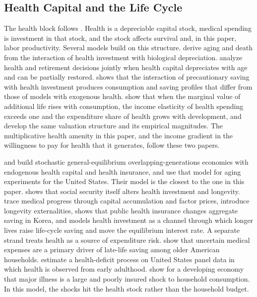 \subsection{Health Capital and the Life Cycle}
\label{subsec:lit_longevity}

The health block follows \citet{Grossman1972}. Health is a depreciable capital stock, medical spending is investment in that stock, and the stock affects survival and, in this paper, labor productivity. Several models build on this structure. \citet{DalgaardStrulik2014} derive aging and death from the interaction of health investment with biological depreciation. \citet{KuhnFeichtinger2015} analyze health and retirement decisions jointly when health capital depreciates with age and can be partially restored. \citet{Fioroni2010} shows that the interaction of precautionary saving with health investment produces consumption and saving profiles that differ from those of models with exogenous health. \citet{HallJones2007} show that when the marginal value of additional life rises with consumption, the income elasticity of health spending exceeds one and the expenditure share of health grows with development, and \citet{MurphyTopel2006} develop the same valuation structure and its empirical magnitudes. The multiplicative health amenity in this paper, and the income gradient in the willingness to pay for health that it generates, follow these two papers.

\citet{JungTran2016} and \citet{JungTranChambers2017} build stochastic general-equilibrium overlapping-generations economies with endogenous health capital and health insurance, and \citet{JungTranChambers2017} use that model for aging experiments for the United States. Their model is the closest to the one in this paper. \citet{Zhao2014} shows that social security itself alters health investment and longevity. \citet{FrankovicWrzaczek2020} trace medical progress through capital accumulation and factor prices, \citet{YewZhang2018} introduce longevity externalities, \citet{Lim2020} shows that public health insurance changes aggregate saving in Korea, and \citet{Carrasco2026} models health investment as a channel through which longer lives raise life-cycle saving and move the equilibrium interest rate. A separate strand treats health as a source of expenditure risk. \citet{DeNardi2010} show that uncertain medical expenses are a primary driver of late-life saving among older American households. \citet{HosseiniKopeckyZhao} estimate a health-deficit process on United States panel data in which health is observed from early adulthood. \citet{GertlerGruber2002} show for a developing economy that major illness is a large and poorly insured shock to household consumption. In this model, the shocks hit the health stock rather than the household budget.

